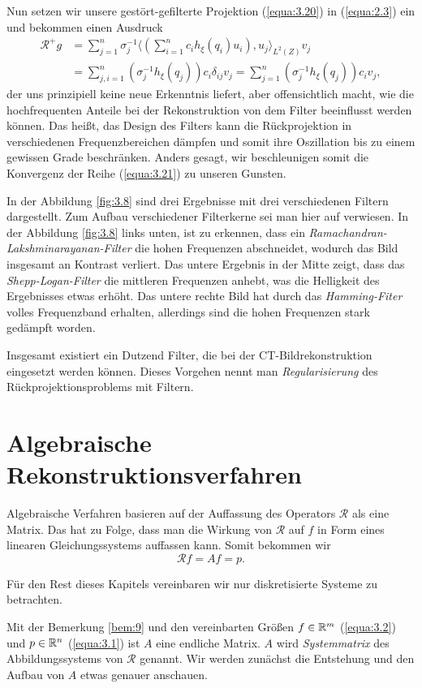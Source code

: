 Nun setzen wir unsere gestört-gefilterte Projektion (\ref{equa:3.20}) in (\ref{equa:2.3}) ein und bekommen einen Ausdruck
\begin{equation}
	\begin{split}
		\mathcal{R}^{+} g & = \sum\limits_{j = 1}^{n} \sigma_j^{-1} \langle \left( \sum \limits_{i = 1}^{n} c_i h_{\xi}(q_i) u_i \right), u_j \rangle_{L^2(Z)} v_j \\
		& = \sum\limits_{j,i = 1}^{n} ( \sigma_j^{-1} h_{\xi}(q_j) ) c_i \delta_{ij} v_j = \sum\limits_{j = 1}^{n} ( \sigma_j^{-1} h_{\xi}(q_j) ) c_i v_j,
	\end{split}
	\label{equa:3.21}
\end{equation}
der uns prinzipiell keine neue Erkenntnis liefert, aber offensichtlich macht, wie die hochfrequenten Anteile bei der Rekonstruktion von dem Filter beeinflusst werden können. Das heißt, das Design des Filters kann die Rückprojektion in verschiedenen Frequenzbereichen dämpfen und somit ihre Oszillation bis zu einem gewissen Grade beschränken. Anders gesagt, wir beschleunigen somit die Konvergenz der Reihe (\ref{equa:3.21}) zu unseren Gunsten. 

In der Abbildung \ref{fig:3.8} sind drei Ergebnisse mit drei verschiedenen Filtern dargestellt. Zum Aufbau verschiedener Filterkerne sei man hier auf \cite[S. 191]{Buzug04} verwiesen. In der Abbildung \ref{fig:3.8} links unten, ist zu erkennen, dass ein \textit{Ramachandran-Lakshminarayanan-Filter} die hohen Frequenzen abschneidet, wodurch das Bild insgesamt an Kontrast verliert. Das untere Ergebnis in der Mitte zeigt, dass das \textit{Shepp-Logan-Filter} die mittleren Frequenzen anhebt, was die Helligkeit des Ergebnisses etwas erhöht. Das untere rechte Bild hat durch das \textit{Hamming-Fiter} volles Frequenzband erhalten, allerdings sind die hohen Frequenzen stark gedämpft worden.

Insgesamt existiert ein Dutzend Filter, die bei der CT-Bildrekonstruktion eingesetzt werden können. Dieses Vorgehen nennt man \textit{Regularisierung} des Rückprojektionsproblems mit Filtern.  

\section*{Algebraische Rekonstruktionsverfahren}
\label{cha:3.2}

Algebraische Verfahren basieren auf der Auffassung des Operators $\mathcal{R}$ als eine Matrix. Das hat zu Folge, dass man die Wirkung von $\mathcal{R}$ auf $f$ in Form eines linearen Gleichungssystems auffassen kann. Somit bekommen wir
\begin{equation}
	\mathcal{R}f = Af = p.
	\label{equa:3.22}
\end{equation}
\begin{Bemerkung}
	Für den Rest dieses Kapitels vereinbaren wir nur diskretisierte Systeme zu betrachten. 
	\label{bem:9}
\end{Bemerkung}
Mit der Bemerkung \ref{bem:9} und den vereinbarten Größen $f \in \mathbb{R}^m$ (\ref{equa:3.2}) und $p \in \mathbb{R}^n$ (\ref{equa:3.1}) ist $A$ eine endliche Matrix. $A$ wird \textit{Systemmatrix} des Abbildungssystems von $\mathcal{R}$ genannt. Wir werden zunächst die Entstehung und den Aufbau von $A$ etwas genauer anschauen. 

